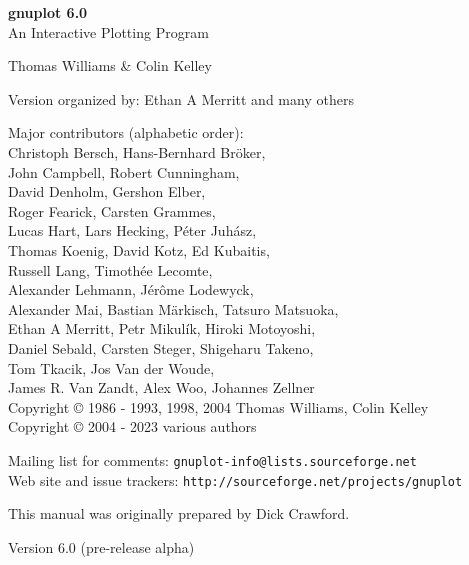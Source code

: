 \documentclass[10pt,twoside]{article}
\def\gpVersion{6.0}
\def\gnuplotVersion{\usebox\GpVersion}
\begin{document}
\sloppy
\thispagestyle{empty}
\rule{0in}{1.0in}

  \begin{center}

  {\huge\bf {gnuplot \gpVersion}}\\
  \vspace{3ex}
  {\Large An Interactive Plotting Program}\\

  \vspace{2ex}

  \large
  Thomas Williams \& Colin Kelley\\

  \vspace{2ex}

  Version
    {\gnuplotVersion }
  organized by: Ethan A Merritt and many others\\

   \vspace{2ex}

  Major contributors (alphabetic order):\\

  Christoph Bersch,
  Hans-Bernhard Bröker,\\
  John Campbell,
  Robert Cunningham,\\
  David Denholm,
  Gershon Elber,\\
  Roger Fearick,
  Carsten Grammes,\\
  Lucas Hart,
  Lars Hecking,
  Péter Juhász,\\
  Thomas Koenig,
  David Kotz,
  Ed Kubaitis,\\
  Russell Lang,
  Timothée Lecomte,\\
  Alexander Lehmann,
  Jérôme Lodewyck,\\
  Alexander Mai,
  Bastian Märkisch,
  Tatsuro Matsuoka, \\
  Ethan A Merritt,
  Petr Mikulík,
  Hiroki Motoyoshi, \\
  Daniel Sebald,
  Carsten Steger,
  Shigeharu Takeno,\\
  Tom Tkacik,
  Jos Van der Woude,\\
  James R. Van Zandt,
  Alex Woo,
  Johannes Zellner\\
  Copyright {\copyright} 1986 - 1993, 1998, 2004   Thomas Williams, Colin Kelley\\
  Copyright {\copyright} 2004 - 2023  various authors\\

  \vspace{2ex}

  Mailing list for comments: \verb+gnuplot-info@lists.sourceforge.net+\\
  Web site and issue trackers: \verb+http://sourceforge.net/projects/gnuplot+

  \vfill
  This manual was originally prepared by Dick Crawford. \\

  \vspace{2ex}

   Version {\gpVersion} (pre-release alpha)

   \end{center}
\newpage


\hypertarget{TableOfContents}{}
\tableofcontents

\newpage
\end{document}
